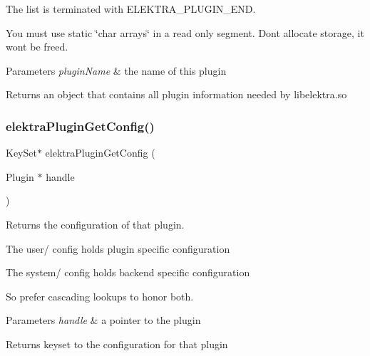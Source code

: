 The list is terminated with {\ttfamily E\+L\+E\+K\+T\+R\+A\+\_\+\+P\+L\+U\+G\+I\+N\+\_\+\+E\+ND}.

You must use static \char`\"{}char arrays\char`\"{} in a read only segment. Don\textquotesingle{}t allocate storage, it won\textquotesingle{}t be freed.


\begin{DoxyParams}{Parameters}
{\em plugin\+Name} & the name of this plugin \\
\hline
\end{DoxyParams}
\begin{DoxyReturn}{Returns}
an object that contains all plugin information needed by libelektra.\+so 
\end{DoxyReturn}
\mbox{\label{group__plugin_ga644bead796506c172817724051c977c9}} 
\subsubsection{\texorpdfstring{elektraPluginGetConfig()}{elektraPluginGetConfig()}}
{\footnotesize\ttfamily Key\+Set$\ast$ elektra\+Plugin\+Get\+Config (\begin{DoxyParamCaption}\item[{Plugin $\ast$}]{handle }\end{DoxyParamCaption})}



Returns the configuration of that plugin. 


\begin{DoxyItemize}
\item The user/ config holds plugin specific configuration
\item The system/ config holds backend specific configuration
\end{DoxyItemize}

So prefer cascading lookups to honor both.


\begin{DoxyParams}{Parameters}
{\em handle} & a pointer to the plugin\\
\hline
\end{DoxyParams}
\begin{DoxyReturn}{Returns}
keyset to the configuration for that plugin 
\end{DoxyReturn}
\mbox{\label{group__plugin_gaafcf3216b46292f222b8cc7828b4dd20}} 
